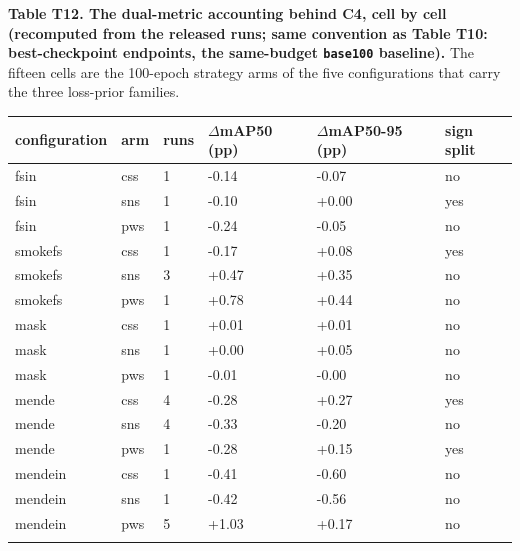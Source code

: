\documentclass[pdflatex,sn-mathphys-ay]{sn-jnl}
\begin{document}
\textbf{Table T12. The dual-metric accounting behind C4, cell by cell (recomputed from the released runs; same convention as Table T10: best-checkpoint endpoints, the same-budget \texttt{base100} baseline).} The fifteen cells are the 100-epoch strategy arms of the five configurations that carry the three loss-prior families.

{\footnotesize
\setlength{\tabcolsep}{4pt}
\begin{longtable}{p{}p{}p{}p{}p{}p{}}
\toprule
configuration & arm & runs & $\Delta$mAP50 (pp) & $\Delta$mAP50-95 (pp) & sign split \\
\midrule
\endhead
fsin & css & 1 & -0.14 & -0.07 & no \\
fsin & sns & 1 & -0.10 & +0.00 & yes \\
fsin & pws & 1 & -0.24 & -0.05 & no \\
smokefs & css & 1 & -0.17 & +0.08 & yes \\
smokefs & sns & 3 & +0.47 & +0.35 & no \\
smokefs & pws & 1 & +0.78 & +0.44 & no \\
mask & css & 1 & +0.01 & +0.01 & no \\
mask & sns & 1 & +0.00 & +0.05 & no \\
mask & pws & 1 & -0.01 & -0.00 & no \\
mende & css & 4 & -0.28 & +0.27 & yes \\
mende & sns & 4 & -0.33 & -0.20 & no \\
mende & pws & 1 & -0.28 & +0.15 & yes \\
mendein & css & 1 & -0.41 & -0.60 & no \\
mendein & sns & 1 & -0.42 & -0.56 & no \\
mendein & pws & 5 & +1.03 & +0.17 & no \\
\botrule
\end{longtable}}
\end{document}
